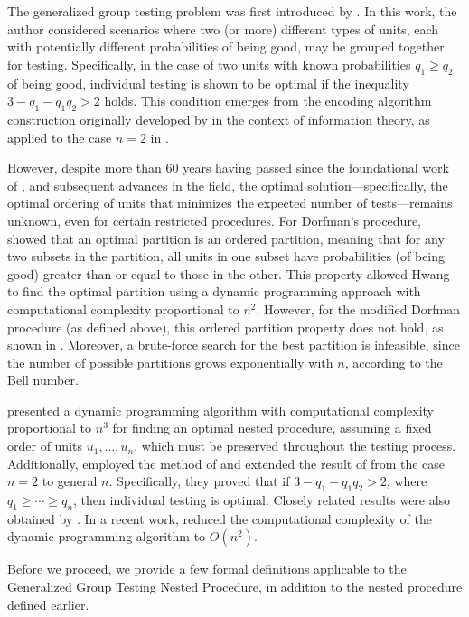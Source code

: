 \documentclass[12pt]{article}
\begin{document}
The generalized group testing problem was first introduced by \citet[pg.~144]{S1960}. In this work, the author considered scenarios where two (or more) different types of units, each with potentially different probabilities of being good, may be grouped together for testing. Specifically, in the case of two units with known probabilities $q_1\geq q_2$
of being good, individual testing is shown to be optimal if the inequality $3-q_1-q_1q_2>2$ holds. This condition emerges from the encoding algorithm construction originally developed by \citet{H1952} in the context of information theory, as applied to the case $n=2$ in \citet{S1960}.

However, despite more than 60 years having passed since the foundational work of \citet{S1960}, and subsequent advances in the field, the optimal solution—specifically, the optimal ordering of units that minimizes the expected number of tests—remains unknown, even for certain restricted procedures.
For Dorfman's procedure, \citet{H1975} showed that an optimal partition is an ordered partition, meaning that for any two subsets in the partition, all units in one subset have probabilities (of being good) greater than or equal to those in the other. This property allowed Hwang to find the optimal partition using a dynamic programming approach with computational complexity proportional to $n^2$.
However, for the modified Dorfman procedure (as defined above), this ordered partition property does not hold, as shown in \citet{M2017}. Moreover, a brute-force search for the best partition is infeasible, since the number of possible partitions grows exponentially with $n$, according to the Bell number.

\cite{KS1988} presented a dynamic programming algorithm with computational complexity proportional to $n^3$ for finding an optimal nested procedure, assuming a fixed order of units $u_1,\ldots,u_n$, which must be preserved throughout the testing process. Additionally, \cite{KS1988} employed the method of \cite{U1960} and extended the result of \cite{S1960} from the case $n=2$ to general $n$.
Specifically, they proved that if $3-q_1-q_1q_2>2$, where $q_1\geq\cdots \geq q_n$, then individual testing is optimal.
Closely related results were also obtained by \cite{YH1988b}.
In a recent work, \cite{SV2025} reduced the computational complexity of the dynamic programming algorithm to $O(n^2)$.

Before we proceed, we provide a few formal definitions applicable to the Generalized Group Testing Nested Procedure, in addition to the nested procedure defined earlier.
\end{document}
